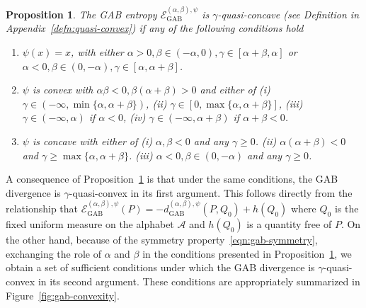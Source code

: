 \documentclass[11pt]{article}
\theoremstyle{plain}
\newtheorem{proposition}{Proposition}
\theoremstyle{remark}
\newcommand{\dGAB}{d_{\mathrm{GAB}}}
\newcommand{\eGAB}{\mathcal{E}_{\mathrm{GAB}}}
\begin{document}
\begin{proposition}\label{thm:gab-entropy-concave}
    The GAB entropy $\eGAB^{(\alpha,\beta),\psi}$ is $\gamma$-quasi-concave (see Definition in Appendix~\ref{defn:quasi-convex}) if any of the following conditions hold
    \begin{enumerate}
        \item $\psi(x) = x$, with either $\alpha > 0, \beta \in (-\alpha, 0), \gamma \in [\alpha+\beta, \alpha]$ or $\alpha < 0, \beta \in (0, -\alpha), \gamma \in [\alpha, \alpha+\beta]$.
        \item $\psi$ is convex with $\alpha\beta < 0, \beta(\alpha+\beta) > 0$ and either of (i) $\gamma \in (-\infty, \min\{\alpha,\alpha+\beta\})$, (ii) $\gamma \in [0, \max\{\alpha, \alpha+\beta\}]$, (iii) $\gamma \in (-\infty, \alpha)$ if $\alpha < 0$, (iv) $\gamma \in (-\infty, \alpha +\beta)$ if $\alpha+\beta < 0$.
        \item $\psi$ is concave with either of (i) $\alpha, \beta < 0$ and any $\gamma \geq 0$. (ii) $\alpha(\alpha+\beta) < 0$ and $\gamma \geq \max\{\alpha, \alpha+\beta\}$. (iii) $\alpha < 0, \beta \in (0, -\alpha)$ and any $\gamma \geq 0$.
    \end{enumerate}
\end{proposition}


A consequence of Proposition~\ref{thm:gab-entropy-concave} is that under the same conditions, the GAB divergence is $\gamma$-quasi-convex in its first argument. This follows directly from the relationship that $\eGAB^{(\alpha,\beta),\psi}(P) = -\dGAB^{(\alpha,\beta),\psi}(P, Q_0) + h(Q_0)$ where $Q_0$ is the fixed uniform measure on the alphabet $\mathcal{A}$ and $h(Q_0)$ is a quantity free of $P$. On the other hand, because of the symmetry property~\eqref{eqn:gab-symmetry}, exchanging the role of $\alpha$ and $\beta$ in the conditions presented in Proposition~\ref{thm:gab-entropy-concave}, we obtain a set of sufficient conditions under which the GAB divergence is $\gamma$-quasi-convex in its second argument. These conditions are appropriately summarized in Figure~\ref{fig:gab-convexity}.
\end{document}
